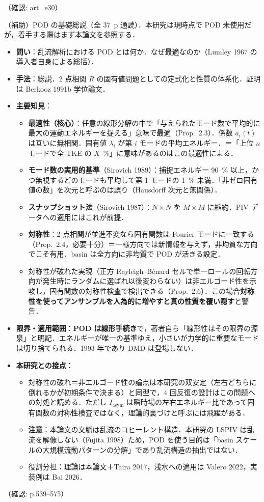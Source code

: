 \documentclass[11pt]{jsarticle}
\newcommand{\litref}[1]{{\large\bfseries\color{citecolor}#1}}
\begin{document}
\noindent（確認: art.\ e30）

\noindent\litref{Berkooz et al. (1993)}\quad（補助）POD の基礎総説（全 37~p 通読）．本研究は現時点で POD 未使用だが，着手する際はまず本論文を参照する．
\begin{itemize}
  \item \textbf{問い}：乱流解析における POD とは何か．なぜ最適なのか（Lumley 1967 の導入者自身による総括）．
  \item \textbf{手法}：総説．2 点相関 $R$ の固有値問題としての定式化と性質の体系化．証明は Berkooz 1991b 学位論文．
  \item \textbf{主要知見}：
  \begin{itemize}
    \item \textbf{最適性（核心）}：任意の線形分解の中で「与えられたモード数で平均的に最大の運動エネルギーを捉える」意味で最適（Prop.~2.3）．係数 $a_i(t)$ は互いに無相関．固有値 $\lambda_i$ が第 $i$ モードの平均エネルギー．＝「上位 $n$ モードで全 TKE の $X$~\%」に意味があるのはこの最適性による．
    \item \textbf{モード数の実用的基準}（Sirovich 1989）：捕捉エネルギー 90~\% 以上，かつ無視するどのモードも平均して第 1 モードの 1~\% 未満．「非ゼロ固有値の数」を次元と呼ぶのは誤り（Hausdorff 次元と無関係）．
    \item \textbf{スナップショット法}（Sirovich 1987）：$N \times N$ を $M \times M$ に縮約．PIV データへの適用にはこれが前提．
    \item \textbf{対称性}：2 点相関が並進不変なら固有関数は Fourier モードに一致する（Prop.~2.4，必要十分）＝一様方向では新情報を与えず，非均質な方向でこそ有用．basin は全方向に非均質で POD が活きる設定．
    \item 対称性が破れた実現（正方 Rayleigh--B\'enard セルで単一ロールの回転方向が発生時にランダムに選ばれ以後変わらない）は非エルゴード性を示唆し，固有関数の対称性検査で検出できる（Prop.~2.6）．この場合\textbf{対称性を使ってアンサンブルを人為的に増やすと真の性質を覆い隠す}と警告．
  \end{itemize}
  \item \textbf{限界・適用範囲}：\textbf{POD は線形手続き}で，著者自ら「線形性はその限界の源泉」と明記．エネルギーが唯一の基準ゆえ，小さいが力学的に重要なモードは切り捨てられる．1993 年であり DMD は登場しない．
  \item \textbf{本研究との接点}：
  \begin{itemize}
    \item 対称性の破れ＝非エルゴード性の論点は本研究の双安定（左右どちらに倒れるかが初期条件で決まる）と同型で，4 回反復の設計はこの問題への対処と読める．ただし $I_\mathrm{asym}$ は瞬時場の左右エネルギー比であって固有関数の対称性検査ではなく，理論的裏づけと呼ぶには飛躍がある．
    \item \textbf{注意}：本論文の文脈は乱流のコヒーレント構造．本研究の LSPIV は乱流を解像しない（Fujita 1998）ため，POD を使う目的は「basin スケールの大規模流動パターンの分解」であり乱流構造の抽出ではない．
    \item 役割分担：理論は本論文＋Taira 2017，浅水への適用は Valero 2022，実装例は Bai 2026．
  \end{itemize}
\end{itemize}
\noindent（確認: p.539--575）
\end{document}

